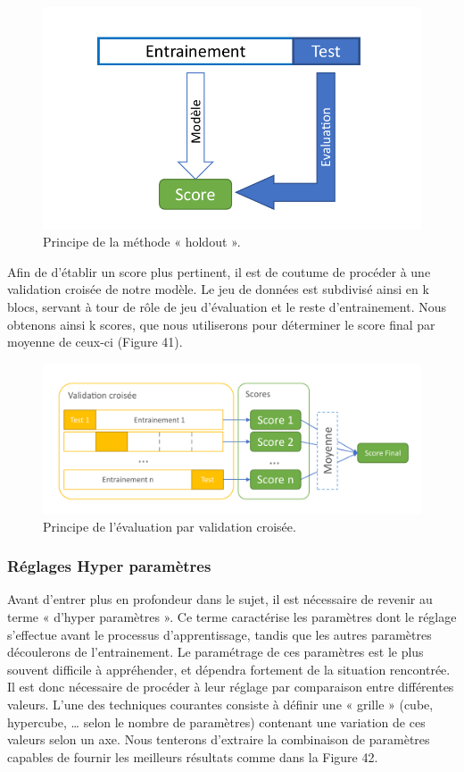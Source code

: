 \begin{figure}[H]
    \centering
    \includegraphics[width=\linewidth]{contents/chapter_3/resources/Holdout.pdf}
    \caption{Principe de la méthode « holdout ».}
    \label{fig:chapter_3:Holdout}
\end{figure}

Afin de d’établir un score plus pertinent, il est de coutume de procéder à une validation croisée de notre modèle. Le jeu de données est subdivisé ainsi en k blocs, servant à tour de rôle de jeu d’évaluation et le reste d’entrainement. Nous obtenons ainsi k scores, que nous utiliserons pour déterminer le score final par moyenne de ceux-ci (Figure 41).
 
 \begin{figure}[H]
    \centering
    \includegraphics[width=\linewidth]{contents/chapter_3/resources/CrossValidation.pdf}
    \caption{Principe de l’évaluation par validation croisée.}
    \label{fig:chapter_3:CrossValidation}
\end{figure}

\subsubsection{Réglages Hyper paramètres}
Avant d’entrer plus en profondeur dans le sujet, il est nécessaire de revenir au terme « d’hyper paramètres ». Ce terme caractérise les paramètres dont le réglage s’effectue avant le processus d’apprentissage, tandis que les autres paramètres découlerons de l’entrainement.
Le paramétrage de ces paramètres est le plus souvent difficile à appréhender, et dépendra fortement de la situation rencontrée. Il est donc nécessaire de procéder à leur réglage par comparaison entre différentes valeurs. L’une des techniques courantes consiste à définir une « grille » (cube, hypercube, … selon le nombre de paramètres) contenant une variation de ces valeurs selon un axe. Nous tenterons d’extraire la combinaison de paramètres capables de fournir les meilleurs résultats comme dans la Figure 42.


